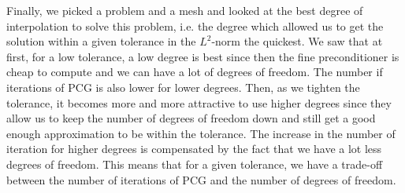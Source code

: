 Finally, we picked a problem and a mesh and looked at the best degree of interpolation to solve this problem, i.e. the degree which allowed us to get the solution within a given tolerance in the $L^2$-norm the quickest. We saw that at first, for a low tolerance, a low degree is best since then the fine preconditioner is cheap to compute and we can have a lot of degrees of freedom. The number if iterations of PCG is also lower for lower degrees. Then, as we tighten the tolerance, it becomes more and more attractive to use higher degrees since they allow us to keep the number of degrees of freedom down and still get a good enough approximation to be within the tolerance. The increase in the number of iteration for higher degrees is compensated by the fact that we have a lot less degrees of freedom. This means that for a given tolerance, we have a trade-off between the number of iterations of PCG and the number of degrees of freedom. 